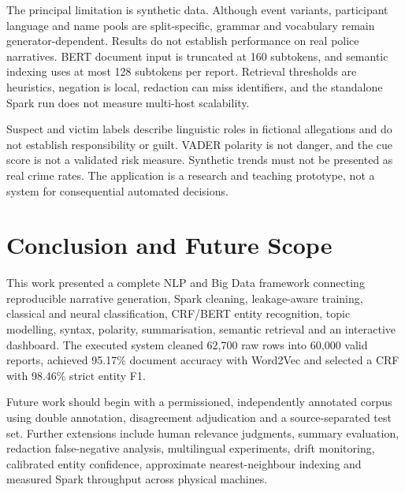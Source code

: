 \documentclass[conference]{IEEEtran}
\begin{document}
The principal limitation is synthetic data. Although event variants, participant language and name pools are split-specific, grammar and vocabulary remain generator-dependent. Results do not establish performance on real police narratives. BERT document input is truncated at 160 subtokens, and semantic indexing uses at most 128 subtokens per report. Retrieval thresholds are heuristics, negation is local, redaction can miss identifiers, and the standalone Spark run does not measure multi-host scalability.

Suspect and victim labels describe linguistic roles in fictional allegations and do not establish responsibility or guilt. VADER polarity is not danger, and the cue score is not a validated risk measure. Synthetic trends must not be presented as real crime rates. The application is a research and teaching prototype, not a system for consequential automated decisions.

\section{Conclusion and Future Scope}

This work presented a complete NLP and Big Data framework connecting reproducible narrative generation, Spark cleaning, leakage-aware training, classical and neural classification, CRF/BERT entity recognition, topic modelling, syntax, polarity, summarisation, semantic retrieval and an interactive dashboard. The executed system cleaned 62,700 raw rows into 60,000 valid reports, achieved 95.17\% document accuracy with Word2Vec and selected a CRF with 98.46\% strict entity F1.

Future work should begin with a permissioned, independently annotated corpus using double annotation, disagreement adjudication and a source-separated test set. Further extensions include human relevance judgments, summary evaluation, redaction false-negative analysis, multilingual experiments, drift monitoring, calibrated entity confidence, approximate nearest-neighbour indexing and measured Spark throughput across physical machines.

\balance
\end{document}

